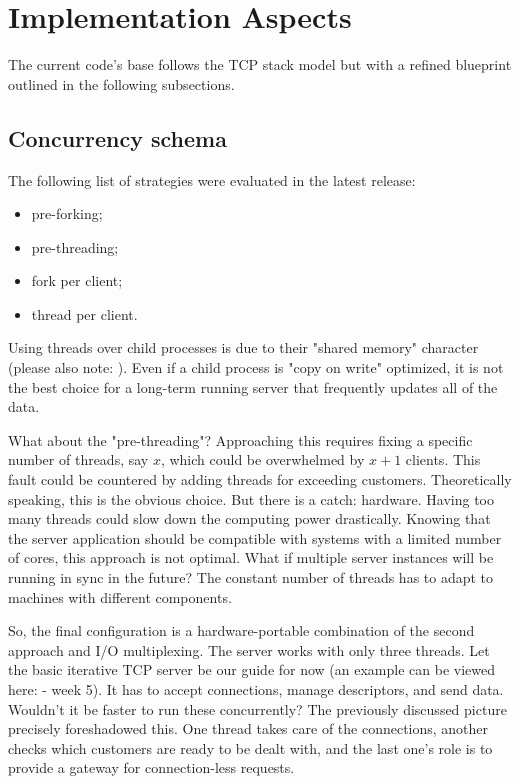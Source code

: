 \documentclass[runningheads]{llncs}
\begin{document}
\section{Implementation Aspects}

The current code's base follows the TCP stack model but with a refined blueprint outlined in the following subsections.

\subsection{Concurrency schema}

The following list of strategies were evaluated in the latest release:
\begin{itemize}
  \item pre-forking;
  \item pre-threading;
  \item fork per client;
  \item thread per client.
\end{itemize}

Using threads over child processes is due to their "shared memory" character (please also note: \cite{fork-vs-thread}). Even if a child process is "copy on write" optimized, it is not the best choice for a long-term running server that frequently updates all of the data. 

What about the "pre-threading"? Approaching this requires fixing a specific number of threads, say $x$, which could be overwhelmed by $x + 1$ clients. This fault could be countered by adding threads for exceeding customers. Theoretically speaking, this is the obvious choice. But there is a catch: hardware. Having too many threads could slow down the computing power drastically. Knowing that the server application should be compatible with systems with a limited number of cores, this approach is not optimal. What if multiple server instances will be running in sync in the future? The constant number of threads has to adapt to machines with different components.

So, the final configuration is a hardware-portable combination of the second approach and I/O multiplexing. The server works with only three threads. Let the basic iterative TCP server be our guide for now (an example can be viewed here: \cite{course} - week 5). It has to accept connections, manage descriptors, and send data. Wouldn't it be faster to run these concurrently? The previously discussed picture precisely foreshadowed this. One thread takes care of the connections, another checks which customers are ready to be dealt with, and the last one's role is to provide a gateway for connection-less requests.
\end{document}
